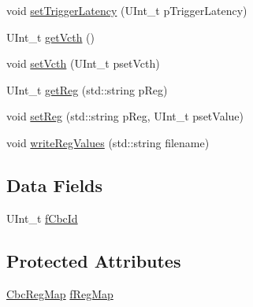 \begin{DoxyCompactItemize}
\item 
void \hyperlink{class_ph2___hw_description_1_1_cbc_ac43c2fdddeab1a2f74c235d62254d249}{set\-Trigger\-Latency} (U\-Int\-\_\-t p\-Trigger\-Latency)
\item 
U\-Int\-\_\-t \hyperlink{class_ph2___hw_description_1_1_cbc_a68aadf88868b196e2df4cd12dcfb48fc}{get\-Vcth} ()
\item 
void \hyperlink{class_ph2___hw_description_1_1_cbc_a4273d56b3d53919b3101736ee303cc39}{set\-Vcth} (U\-Int\-\_\-t pset\-Vcth)
\item 
U\-Int\-\_\-t \hyperlink{class_ph2___hw_description_1_1_cbc_add3d56aa13784672a52baa0f6904b260}{get\-Reg} (std\-::string p\-Reg)
\item 
void \hyperlink{class_ph2___hw_description_1_1_cbc_ae1643483e549d5a658fdf5517929f2a0}{set\-Reg} (std\-::string p\-Reg, U\-Int\-\_\-t pset\-Value)
\item 
void \hyperlink{class_ph2___hw_description_1_1_cbc_a21a95937ae871d154b4d0f7f2fe6bd02}{write\-Reg\-Values} (std\-::string filename)
\end{DoxyCompactItemize}
\subsection*{Data Fields}
\begin{DoxyCompactItemize}
\item 
U\-Int\-\_\-t \hyperlink{class_ph2___hw_description_1_1_cbc_ae2cf74d02b31c1decd979408ac889ca8}{f\-Cbc\-Id}
\end{DoxyCompactItemize}
\subsection*{Protected Attributes}
\begin{DoxyCompactItemize}
\item 
\hyperlink{namespace_ph2___hw_description_a9a23b373068f169aa67ca1d22c9a6001}{Cbc\-Reg\-Map} \hyperlink{class_ph2___hw_description_1_1_cbc_ab4dbf1af172e821d95f77acb7e4fb962}{f\-Reg\-Map}
\end{DoxyCompactItemize}


